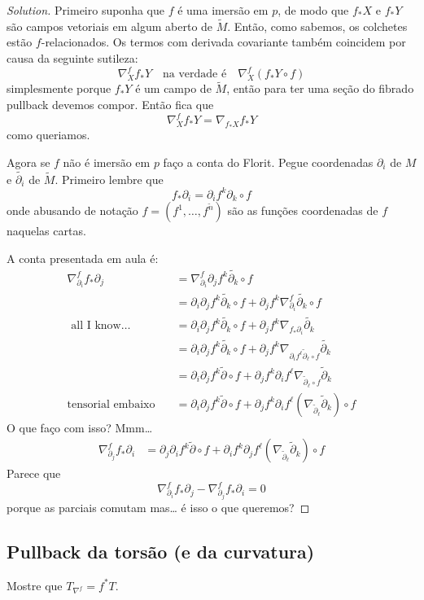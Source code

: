 \begin{proof}[Solution]\leavevmode
Primeiro suponha que \(f\) é uma imersão em \(p\), de modo que \(f_*X\) e \(f_*Y\) são campos vetoriais em algum aberto de \(\tilde{M}\). Então, como sabemos, os colchetes estão \(f\)-relacionados. Os termos com derivada covariante também coincidem por causa da seguinte sutileza:
\[\nabla^f_Xf_*Y\quad \text{na verdade é}\quad \nabla_X^f(f_*Y\circ f) \]
simplesmente porque \(f_*Y\) é um campo de \(\tilde{M}\), então para ter uma seção do fibrado pullback devemos compor. Então fica que
\[\nabla_X^f f_*Y=\nabla_{f_* X}f_*Y\]
como queriamos.

Agora se \(f\) não é imersão em \(p\) faço a conta do Florit. Pegue coordenadas \(\partial_i\) de \(M\) e \(\tilde{\partial_i}\) de \(\tilde{M}\). Primeiro lembre que
\[f_*\partial_i=\partial_if^k\partial_k\circ f\]
onde abusando de notação \(f =(f^1,\ldots,f^{\tilde{n}})\) são as funções coordenadas de \(f\) naquelas cartas.

A conta presentada em aula é:
\begin{align*}
\nabla_{\partial_i}^f f_* \partial_j&=\nabla_{\partial_i}^f\partial_jf^k\tilde{\partial_k}\circ f\\
&=\partial_i\partial_j f^k\tilde{\partial_k}\circ f+\partial_jf^k\nabla^f_{\partial_i}\tilde{\partial_k}\circ f\\
\text{ all I know…}\quad  &=\partial_i\partial_j f^k\tilde{\partial_k}\circ f+\partial_jf^k\nabla_{f_*\partial_i}\tilde{\partial_k} \\
&=\partial_i\partial_j f^k\tilde{\partial_k}\circ f+\partial_jf^k\nabla_{\partial_if^\ell\tilde{\partial}_\ell \circ f}\tilde{\partial_k}\\
&=\partial_i\partial_j f^k\tilde{\partial}\circ f+\partial_j f^k \partial_i f^\ell\nabla_{\tilde{\partial}_\ell \circ f}\tilde{\partial}_k\\
\text{tensorial embaixo}\quad &=\partial_i\partial_j f^k\tilde{\partial}\circ f+\partial_j f^k \partial_i f^\ell\left(\nabla_{\tilde{\partial}_\ell}\tilde{\partial}_k\right)\circ f
\end{align*}
O que faço com isso? Mmm…
\begin{align*}
\nabla_{\partial_j}^f f_* \partial_i&=\partial_j\partial_i f^k\tilde{\partial}\circ f+\partial_i f^k \partial_j f^\ell\left(\nabla_{\tilde{\partial}_\ell}\tilde{\partial}_k\right)\circ f
\end{align*}
Parece que
\[\nabla_{\partial_i}^f f_* \partial_j-\nabla_{\partial_j}^f f_* \partial_i=0\]
porque as parciais comutam mas… é isso o que queremos?
\end{proof}
\fi\subsection{Pullback da torsão (e da curvatura)}
\begin{exercise}\leavevmode
Mostre que \(T_{\nabla^f}=f^*T\).
\end{exercise}


